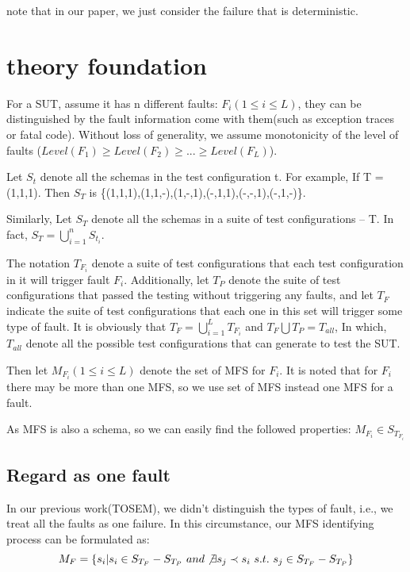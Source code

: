 \documentclass{sig-alternate}
\begin{document}
note that in our paper, we just consider the failure that is deterministic.

\section{theory foundation}
For a SUT, assume it has n different faults: $F_{i} ( 1 \leq i \leq L)$, they can be distinguished by the fault information come with them(such as exception traces or fatal code). Without loss of generality, we assume monotonicity of the level of faults ($Level(F_{1}) \geq Level(F_{2}) \geq ... \geq Level(F_{L}) $).

Let $S_{t}$ denote all the schemas in the test configuration t.  For example, If T = (1,1,1). Then $S_{T}$ is \{(1,1,1),(1,1,-),(1,-,1),(-,1,1),(-,-,1),(-,1,-)\}.

Similarly, Let $S_{T}$ denote all the schemas in a suite of test configurations -- T. In fact, $S_{T} = \bigcup_{i = 1}^{n}S_{t_{i}}$.

The notation $T_{F_{i}}$ denote a suite of test configurations that each test configuration in it will trigger fault $F_{i}$. Additionally, let $T_{P}$ denote the suite of test configurations that passed the testing without triggering any faults, and let $T_{F}$ indicate the suite of test configurations that each one in this set will trigger some type of fault. It is obviously that $T_{F} =  \bigcup_{i = 1}^{L}T_{F_{i}}$ and $T_{F}\bigcup T_{P} = T_{all}$, In which, $T_{all}$ denote all the possible test configurations that can generate to test the SUT.


Then let $ M_{F_{i}} ( 1 \leq i \leq L) $ denote the set of MFS for $F_{i}$. It is noted that for $F_{i}$ there may be more than one MFS, so we use set of MFS instead one MFS for a fault.

As MFS is also a schema, so we can easily find the followed properties:
$ M_{F_{i}} \in S_{T_{F_{i}}} $



\subsection{Regard as one fault}

In our previous work(TOSEM), we didn't distinguish the types of fault, i.e., we treat all the faults as one failure. In this circumstance, our MFS identifying process can be formulated as:
$$ M_{F} = \{s_{i} | s_{i} \in S_{T_{F}} - S_{T_{P}}\ and \not\exists s_{j} \prec s_{i}\ s.t.\ s_{j} \in S_{T_{F}} - S_{T_{P}} \}$$
\end{document}
